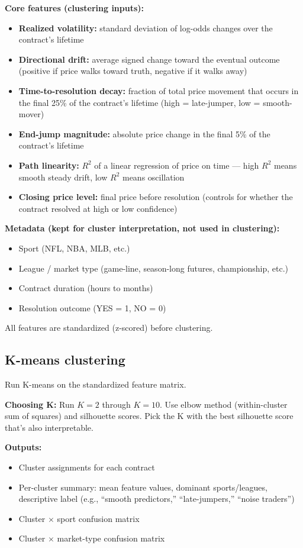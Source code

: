 \documentclass[11pt]{article}
\begin{document}
\textbf{Core features (clustering inputs):}
\begin{itemize}[leftmargin=*, itemsep=0pt]
    \item \textbf{Realized volatility:} standard deviation of log-odds changes over the contract's lifetime
    \item \textbf{Directional drift:} average signed change toward the eventual outcome (positive if price walks toward truth, negative if it walks away)
    \item \textbf{Time-to-resolution decay:} fraction of total price movement that occurs in the final 25\% of the contract's lifetime (high = late-jumper, low = smooth-mover)
    \item \textbf{End-jump magnitude:} absolute price change in the final 5\% of the contract's lifetime
    \item \textbf{Path linearity:} $R^2$ of a linear regression of price on time --- high $R^2$ means smooth steady drift, low $R^2$ means oscillation
    \item \textbf{Closing price level:} final price before resolution (controls for whether the contract resolved at high or low confidence)
\end{itemize}

\textbf{Metadata (kept for cluster interpretation, not used in clustering):}
\begin{itemize}[leftmargin=*, itemsep=0pt]
    \item Sport (NFL, NBA, MLB, etc.)
    \item League / market type (game-line, season-long futures, championship, etc.)
    \item Contract duration (hours to months)
    \item Resolution outcome (YES = 1, NO = 0)
\end{itemize}

All features are standardized (z-scored) before clustering.

\subsection{K-means clustering}

Run K-means on the standardized feature matrix.

\textbf{Choosing K:} Run $K = 2$ through $K = 10$. Use elbow method (within-cluster sum of squares) and silhouette scores. Pick the K with the best silhouette score that's also interpretable.

\textbf{Outputs:}
\begin{itemize}[leftmargin=*, itemsep=0pt]
    \item Cluster assignments for each contract
    \item Per-cluster summary: mean feature values, dominant sports/leagues, descriptive label (e.g., ``smooth predictors,'' ``late-jumpers,'' ``noise traders'')
    \item Cluster $\times$ sport confusion matrix
    \item Cluster $\times$ market-type confusion matrix
\end{itemize}
\end{document}
